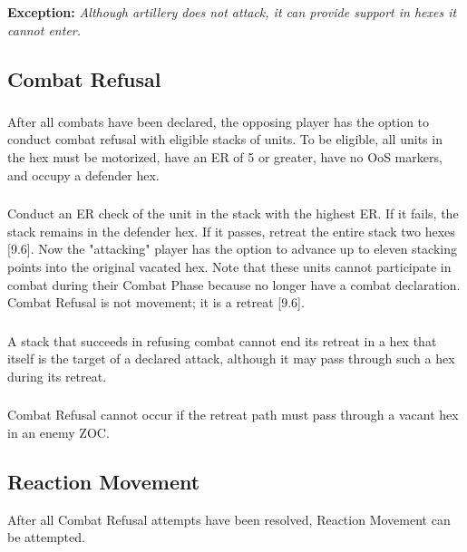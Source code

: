 \textbf{Exception:} \textit{Although artillery does not attack, it can provide support in hexes it cannot enter.}

\subsection{Combat Refusal}
\subsubsection{}
After all combats have been declared, the opposing player has the option to conduct combat refusal with eligible stacks of units. To be eligible, all units in the hex must be motorized, have an ER of 5 or greater, have no OoS markers, and occupy a defender hex.

\subsubsection{}
Conduct an ER check of the unit in the stack with the highest ER. If it fails, the stack remains in the defender hex. If it passes, retreat the entire stack two hexes [9.6]. Now the "attacking" player has the option to advance up to eleven stacking points into the original vacated hex. Note that these units cannot participate in combat during their Combat Phase because no longer have a combat declaration. Combat Refusal is not movement; it is a retreat [9.6].

\subsubsection{}
A stack that succeeds in refusing combat cannot end its retreat in a hex that itself is the target of a declared attack, although it may pass through such a hex during its retreat.

\subsubsection{}
Combat Refusal cannot occur if the retreat path must pass through a vacant hex in an enemy ZOC.

\subsection{Reaction Movement}
After all Combat Refusal attempts have been resolved, Reaction Movement can be attempted.

